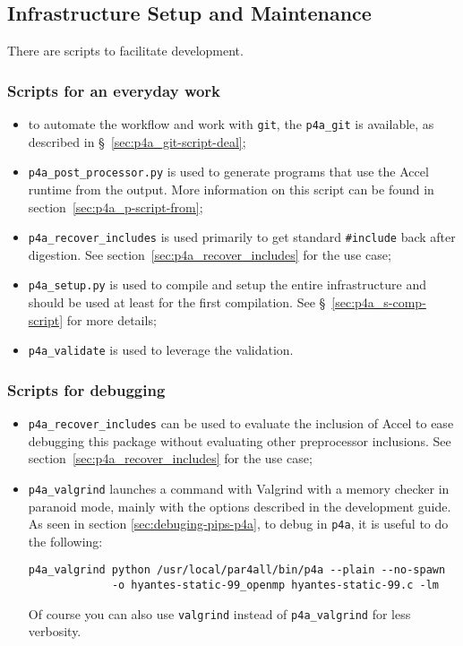 \documentclass[a4paper]{article}
\begin{document}
\subsection{Infrastructure Setup and Maintenance}
\label{sec:setup}

There are scripts to facilitate development.

\subsubsection{Scripts for an everyday work}
\label{sec:an-everyday-work}

\begin{itemize}
\item to automate the \Apfa workflow and work with \texttt{git}, the
  \verb|p4a_git| is available, as described in
  \S~\ref{sec:p4a_git-script-deal};
\item \verb|p4a_post_processor.py| is used to generate programs that use
  the \Apfa Accel runtime from the \Apips output. More information on
  this script can be found in section~\ref{sec:p4a_p-script-from};
\item \verb|p4a_recover_includes| is used primarily to get standard
  \verb|#include| back after \Apips digestion. See
  section~\ref{sec:p4a_recover_includes} for the use case;
\item \verb|p4a_setup.py| is used to compile and setup the entire \Apfa
  infrastructure and should be used at least for the first
  compilation. See \S~\ref{sec:p4a_s-comp-script} for more details;
\item \verb|p4a_validate| is used to leverage the \Apips validation.
\end{itemize}


\subsubsection{Scripts for debugging}
\label{sec:scripts-debugging}

\begin{itemize}
\item \verb|p4a_recover_includes| can be used to evaluate the inclusion of
  \Apfa Accel to ease debugging this package without evaluating other
  preprocessor inclusions. See section~\ref{sec:p4a_recover_includes} for
  the use case;
\item \verb|p4a_valgrind| launches a command with Valgrind with a memory
  checker in paranoid mode, mainly with the options described in the
  \Apips development guide. As seen in section
  \ref{sec:debuging-pips-p4a}, to debug \Apips in \texttt{p4a}, it is
  useful to do the following:
\begin{verbatim}
p4a_valgrind python /usr/local/par4all/bin/p4a --plain --no-spawn
             -o hyantes-static-99_openmp hyantes-static-99.c -lm
\end{verbatim}
  Of course you can also use \texttt{valgrind} instead of
  \verb/p4a_valgrind/ for less verbosity.
\end{itemize}
\end{document}
